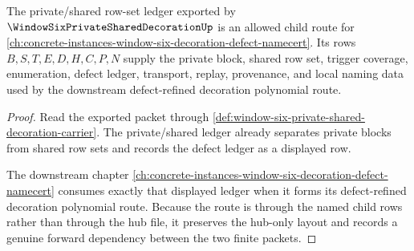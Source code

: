 \begin{proposition}
\label{thm:window-six-private-shared-decoration-defect-forward-route}
The private/shared row-set ledger exported by $\WindowSixPrivateSharedDecorationUp$ is an allowed child route for \autoref{ch:concrete-instances-window-six-decoration-defect-namecert}. Its rows $B,S,T,E,D,H,C,P,N$ supply the private block, shared row set, trigger coverage, enumeration, defect ledger, transport, replay, provenance, and local naming data used by the downstream defect-refined decoration polynomial route.
\end{proposition}
\begin{proof}
Read the exported packet through \autoref{def:window-six-private-shared-decoration-carrier}. The private/shared ledger already separates private blocks from shared row sets and records the defect ledger as a displayed row.

The downstream chapter \autoref{ch:concrete-instances-window-six-decoration-defect-namecert} consumes exactly that displayed ledger when it forms its defect-refined decoration polynomial route. Because the route is through the named child rows rather than through the hub file, it preserves the hub-only layout and records a genuine forward dependency between the two finite packets.
\end{proof}
